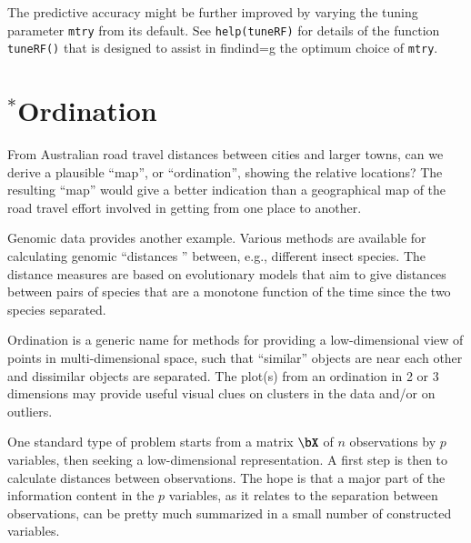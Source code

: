 \documentclass{tufte-book}\usepackage[]{graphicx}\usepackage[]{color}
\newcommand{\txtt}[1]{\texttt{#1}}
\begin{document}
The predictive accuracy might be further improved by varying the
tuning parameter \txtt{mtry} from its default.  See \txtt{help(tuneRF)}
for details of the function \txtt{tuneRF()} that is designed to
assist in findind=g the optimum choice of \txtt{mtry}.

\section{$^*$Ordination}

From Australian road travel distances between cities and larger towns,
can we derive a plausible ``map'', or ``ordination'', showing the relative
locations?  The resulting ``map'' would give a better indication
than a geographical map of the road travel effort involved in getting
from one place to another.


Genomic data provides another example. Various methods are available
for calculating genomic ``distances '' between, e.g., different insect
species. The distance measures are based on evolutionary models that
aim to give distances between pairs of species that are a monotone
function of the time since the two species separated.

Ordination is a generic name for methods for providing a low-dimensional
view of points in multi-dimensional space, such that ``similar'' objects
are near each other and dissimilar objects are separated.  The plot(s)
from an ordination in 2 or 3 dimensions may provide useful visual clues
on clusters in the data and/or on outliers.

One standard type of problem starts from a matrix $\bX$ of $n$
observations by $p$ variables, then seeking a low-dimensional
representation.  A first step is then to calculate distances between
observations.
  The hope is that a major part of the information
content in the $p$ variables, as it relates to the separation between
observations, can be pretty much summarized in a small number of
constructed variables.
\end{document}
